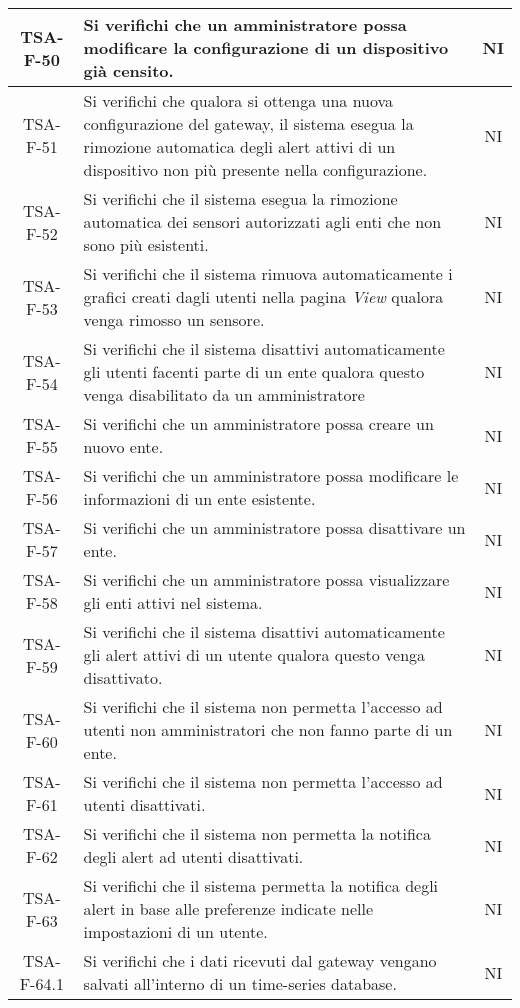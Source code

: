 \begin{center}
\begin{longtable}{|c|p{10cm}|c|}
			 \hline
			 TSA-F-50 & Si verifichi che un amministratore possa modificare la configurazione di un dispositivo già censito. & NI \\
			 \hline
			 TSA-F-51 & Si verifichi che qualora si ottenga una nuova configurazione del gateway, il sistema esegua la rimozione automatica degli alert attivi di un dispositivo non più presente nella configurazione. & NI \\
			 \hline
			 TSA-F-52 & Si verifichi che il sistema esegua la rimozione automatica dei sensori autorizzati agli enti che non sono più esistenti. & NI \\
			 \hline
			 TSA-F-53 & Si verifichi che il sistema rimuova automaticamente i grafici creati dagli utenti nella pagina \textit{View} qualora venga rimosso un sensore. & NI \\
			 \hline
			 TSA-F-54 & Si verifichi che il sistema disattivi automaticamente gli utenti facenti parte di un ente qualora questo venga disabilitato da un amministratore & NI \\
			 \hline
			 TSA-F-55 & Si verifichi che un amministratore possa creare un nuovo ente. & NI \\
			 \hline
			 TSA-F-56 & Si verifichi che un amministratore possa modificare le informazioni di un ente esistente. & NI \\
			 \hline
			 TSA-F-57 & Si verifichi che un amministratore possa disattivare un ente. & NI \\
			 \hline
			 TSA-F-58 & Si verifichi che un amministratore possa visualizzare gli enti attivi nel sistema. & NI \\
			 \hline
			 TSA-F-59 & Si verifichi che il sistema disattivi automaticamente gli alert attivi di un utente qualora questo venga disattivato. & NI \\
			 \hline
			 TSA-F-60 & Si verifichi che il sistema non permetta l'accesso ad utenti non amministratori che non fanno parte di un ente. & NI \\
			 \hline
			 TSA-F-61 & Si verifichi che il sistema non permetta l'accesso ad utenti disattivati. & NI \\
			 \hline
			 TSA-F-62 & Si verifichi che il sistema non permetta la notifica degli alert ad utenti disattivati. & NI \\
			 \hline
			 TSA-F-63 & Si verifichi che il sistema permetta la notifica degli alert in base alle preferenze indicate nelle impostazioni di un utente. & NI \\
			 \hline
			 TSA-F-64.1 & Si verifichi che i dati ricevuti dal gateway vengano salvati all'interno di un time-series database. & NI \\

\end{longtable}
\end{center}
